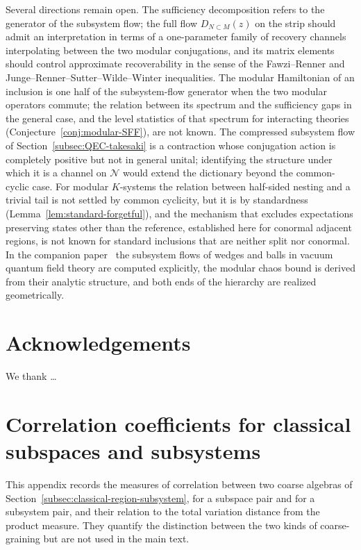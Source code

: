 \documentclass[a4paper,11pt]{article}
\theoremstyle{definition}
\begin{document}
Several directions remain open. The sufficiency decomposition refers to the generator of the subsystem flow; the full flow $D_{N\subset M}(z)$ on the strip should admit an interpretation in terms of a one-parameter family of recovery channels interpolating between the two modular conjugations, and its matrix elements should control approximate recoverability in the sense of the Fawzi--Renner and Junge--Renner--Sutter--Wilde--Winter inequalities. The modular Hamiltonian of an inclusion is one half of the subsystem-flow generator when the two modular operators commute; the relation between its spectrum and the sufficiency gaps in the general case, and the level statistics of that spectrum for interacting theories (Conjecture~\ref{conj:modular-SFF}), are not known. The compressed subsystem flow of Section~\ref{subsec:QEC-takesaki} is a contraction whose conjugation action is completely positive but not in general unital; identifying the structure under which it is a channel on $\mathcal N$ would extend the dictionary beyond the common-cyclic case. For modular $K$-systems the relation between half-sided nesting and a trivial tail is not settled by common cyclicity, but it is by standardness (Lemma~\ref{lem:standard-forgetful}), and the mechanism that excludes expectations preserving states other than the reference, established here for conormal adjacent regions, is not known for standard inclusions that are neither split nor conormal. In the companion paper~\cite{companionQFT} the subsystem flows of wedges and balls in vacuum quantum field theory are computed explicitly, the modular chaos bound is derived from their analytic structure, and both ends of the hierarchy are realized geometrically.

\section*{Acknowledgements}
We thank \ldots

\appendix

\section{Correlation coefficients for classical subspaces and subsystems}\label{app:classical-correlations}

This appendix records the measures of correlation between two coarse algebras of Section~\ref{subsec:classical-region-subsystem}, for a subspace pair and for a subsystem pair, and their relation to the total variation distance from the product measure. They quantify the distinction between the two kinds of coarse-graining but are not used in the main text.
\end{document}

